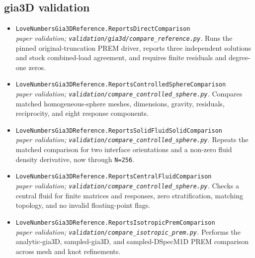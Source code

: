 \subsection*{gia3D validation}
\begin{itemize}[leftmargin=1.4em,itemsep=0.35em]
\item {\footnotesize\texttt{LoveNumbersGia3DReference.ReportsDirectComparison}}\\
\emph{paper validation; \texttt{validation/gia3d/compare\_reference.py}.} Runs the pinned original-truncation PREM driver, reports three independent solutions and stock combined-load agreement, and requires finite residuals and degree-one zeros.
\item {\footnotesize\texttt{LoveNumbersGia3DReference.ReportsControlledSphereComparison}}\\
\emph{paper validation; \texttt{validation/compare\_controlled\_sphere.py}.} Compares matched homogeneous-sphere meshes, dimensions, gravity, residuals, reciprocity, and eight response components.
\item {\footnotesize\texttt{LoveNumbersGia3DReference.ReportsSolidFluidSolidComparison}}\\
\emph{paper validation; \texttt{validation/compare\_controlled\_sphere.py}.} Repeats the matched comparison for two interface orientations and a non-zero fluid density derivative, now through \texttt{N=256}.
\item {\footnotesize\texttt{LoveNumbersGia3DReference.ReportsCentralFluidComparison}}\\
\emph{paper validation; \texttt{validation/compare\_controlled\_sphere.py}.} Checks a central fluid for finite matrices and responses, zero stratification, matching topology, and no invalid floating-point flags.
\item {\footnotesize\texttt{LoveNumbersGia3DReference.ReportsIsotropicPremComparison}}\\
\emph{paper validation; \texttt{validation/compare\_isotropic\_prem.py}.} Performs the analytic-gia3D, sampled-gia3D, and sampled-DSpecM1D PREM comparison across mesh and knot refinements.
\end{itemize}
